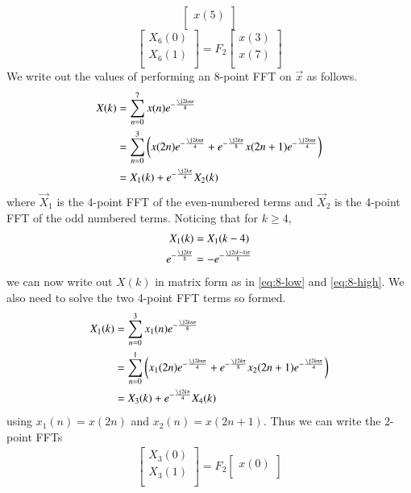 \documentclass[journal,12pt,twocolumn]{IEEEtran}
\renewcommand\thesection{\arabic{section}}
\begin{document}
\begin{enumerate}[label=\thesection.\arabic*]
\begin{equation}
\begin{bmatrix}
		x(5) \\ 
	\end{bmatrix}
\end{equation}
\begin{equation}
	\begin{bmatrix}
		X_{6}(0) \\ 
		X_{6}(1)\\ 
	\end{bmatrix}
	= F_{2}
	\begin{bmatrix}
		x(3) \\ 
		x(7) \\ 
	\end{bmatrix}
\end{equation}
\solution We write out the values of performing an 8-point FFT on $\vec{x}$ as follows.
\begin{align}
	X(k) &= \sum_{n = 0}^{7}x(n)e^{-\frac{\j2kn\pi}{8}} \\
	&= \sum_{n = 0}^{3}\brak{x(2n)e^{-\frac{\j2kn\pi}{4}} + e^{-\frac{\j2k\pi}{8}}x(2n + 1)e^{-\frac{\j2kn\pi}{4}}} \\
	&= X_1(k) + e^{-\frac{\j2k\pi}{4}}X_2(k) 
\end{align}
where $\vec{X}_1$ is the 4-point FFT of the even-numbered terms and $\vec{X}_2$ is the 4-point FFT of the odd numbered terms. Noticing that for $k \geq 4$,
\begin{align}
	X_1(k) &= X_1(k - 4) \\
	e^{-\frac{\j2k\pi}{8}} &= -e^{-\frac{\j2(k - 4)\pi}{8}}
\end{align}
we can now write out $X(k)$ in matrix form as in \eqref{eq:8-low} and \eqref{eq:8-high}. We also need to solve the two 4-point FFT terms so formed.
\begin{align}
	X_1(k) &= \sum_{n = 0}^{3}x_1(n)e^{-\frac{\j2kn\pi}{8}} \\
	&= \sum_{n = 0}^{1}\brak{x_1(2n)e^{-\frac{\j2kn\pi}{4}} + e^{-\frac{\j2k\pi}{8}}x_2(2n + 1)e^{-\frac{\j2kn\pi}{4}}} \\
	&= X_3(k) + e^{-\frac{\j2k\pi}{4}}X_4(k) 
\end{align}
using $x_1(n) = x(2n)$ and $x_2(n) = x(2n + 1)$. Thus we can write the 2-point FFTs
\begin{align}
	\begin{bmatrix}
		X_{3}(0) \\ 
		X_{3}(1)\\ 
	\end{bmatrix}
	= F_{2}
	\begin{bmatrix}
		x(0) \\ 

\end{bmatrix}
\end{align}
\end{enumerate}
\end{document}
